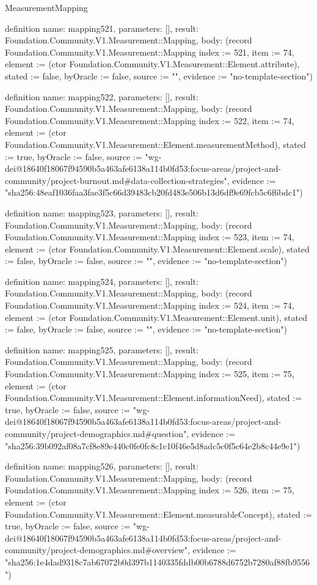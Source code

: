 \begin{lexlean}{MeasurementMapping}
\begin{semanticmodule}
definition{
  name: mapping521,
  parameters: [],
  result: Foundation.Community.V1.Measurement::Mapping,
  body: (record Foundation.Community.V1.Measurement::Mapping {index := 521, item := 74, element := (ctor Foundation.Community.V1.Measurement::Element.attribute), stated := false, byOracle := false, source := "", evidence := "no-template-section"})
}

definition{
  name: mapping522,
  parameters: [],
  result: Foundation.Community.V1.Measurement::Mapping,
  body: (record Foundation.Community.V1.Measurement::Mapping {index := 522, item := 74, element := (ctor Foundation.Community.V1.Measurement::Element.measurementMethod), stated := true, byOracle := false, source := "wg-dei@18640f18067f94590b5a463afe6138a114b0fd53:focus-areas/project-and-community/project-burnout.md#data-collection-strategies", evidence := "sha256:48eaf1036faa3fae3f5c66d39483cb20fd483e506b13d6df9e69fcb5c6f6bdc1"})
}

definition{
  name: mapping523,
  parameters: [],
  result: Foundation.Community.V1.Measurement::Mapping,
  body: (record Foundation.Community.V1.Measurement::Mapping {index := 523, item := 74, element := (ctor Foundation.Community.V1.Measurement::Element.scale), stated := false, byOracle := false, source := "", evidence := "no-template-section"})
}

definition{
  name: mapping524,
  parameters: [],
  result: Foundation.Community.V1.Measurement::Mapping,
  body: (record Foundation.Community.V1.Measurement::Mapping {index := 524, item := 74, element := (ctor Foundation.Community.V1.Measurement::Element.unit), stated := false, byOracle := false, source := "", evidence := "no-template-section"})
}

definition{
  name: mapping525,
  parameters: [],
  result: Foundation.Community.V1.Measurement::Mapping,
  body: (record Foundation.Community.V1.Measurement::Mapping {index := 525, item := 75, element := (ctor Foundation.Community.V1.Measurement::Element.informationNeed), stated := true, byOracle := false, source := "wg-dei@18640f18067f94590b5a463afe6138a114b0fd53:focus-areas/project-and-community/project-demographics.md#question", evidence := "sha256:39b092af08a7cf8e89e440c0fe0fc8c1c10f46e5d8adc5c0f5c64e2b8c44e9e1"})
}

definition{
  name: mapping526,
  parameters: [],
  result: Foundation.Community.V1.Measurement::Mapping,
  body: (record Foundation.Community.V1.Measurement::Mapping {index := 526, item := 75, element := (ctor Foundation.Community.V1.Measurement::Element.measurableConcept), stated := true, byOracle := false, source := "wg-dei@18640f18067f94590b5a463afe6138a114b0fd53:focus-areas/project-and-community/project-demographics.md#overview", evidence := "sha256:1e4dad9318c7ab67072b0d397b1140335fddb00b6788d6752b7280af88fb9556"})
}


\end{semanticmodule}
\end{lexlean}
